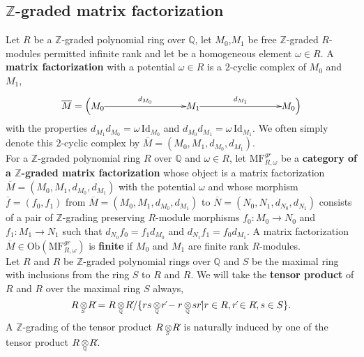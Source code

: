 \documentclass[10pt]{amsart}
\theoremstyle{break}
\begin{document}
\subsection{${{\mathbb{Z}}}$-graded matrix factorization}
\indent
Let $R$ be a ${{\mathbb{Z}}}$-graded polynomial ring over ${{\mathbb{Q}}}$, let $M_0$,$M_1$ be free ${{\mathbb{Z}}}$-graded $R$-modules permitted infinite rank and let be a homogeneous element $\omega \in R$. 
A {\bf matrix factorization} 
with a potential $\omega \in R$ is a $2$-cyclic complex of $M_0$ and $M_1$,
$$
\overline{M}=\Big( \xymatrix{
*^{M_0}\ar[rrr]^{d_{M_0}}&&&*^{M_1}\ar[rrr]^{d_{M_1}}&&&*^{M_0}
}
\Big)
$$
with the properties $d_{M_1} d_{M_0} = \omega\,{{\mathrm{Id}}}_{M_0}$ and $d_{M_0} d_{M_1} = \omega\,{{\mathrm{Id}}}_{M_1}$. We often simply denote this $2$-cyclic complex by $\overline{M}=(M_0,M_1,d_{M_0},d_{M_1})$.\\
\indent
For a ${{\mathbb{Z}}}$-graded polynomial ring $R$ over ${{\mathbb{Q}}}$ and $\omega \in R$, let ${{\mathrm{MF}}}^{gr}_{R,\omega}$ be a {\bf category of a ${{\mathbb{Z}}}$-graded matrix factorization} 
whose object is a matrix factorization $\overline{M}=(M_0,M_1,d_{M_0},d_{M_1})$ with the potential $\omega$ 
and whose morphism $\overline{f}=(f_0,f_1)$ from $\overline{M}=(M_0,M_1,d_{M_0},d_{M_1})$ to $\overline{N}=(N_0,N_1,d_{N_0},d_{N_1})$ consists of a pair of ${{\mathbb{Z}}}$-grading preserving $R$-module morphisms 
$f_0:M_0 \to N_0$ and $f_1:M_1 \to N_1$ such that $d_{N_0} f_0 = f_1 d_{M_0}$ and 
$d_{N_1} f_1 = f_0 d_{M_1}$. A matrix factorization $\overline{M}\in {{\mathrm{Ob}}} ({{\mathrm{MF}}}^{gr}_{R,\omega})$ is {\bf finite} if $M_0$ and $M_1$ are finite rank $R$-modules.\\
\indent
Let $R$ and $R\acute{}$ be ${{\mathbb{Z}}}$-graded polynomial rings over ${{\mathbb{Q}}}$ and $S$ be the maximal ring with inclusions from the ring $S$ to $R$ and $R\acute{}$.
We will take the {\bf tensor product} of $R$ and $R\acute{}$ over the maximal ring $S$ always,
\begin{equation*}
R{{\,\otimes\hspace{-0.7em}\raisebox{-0.5ex}{${}_{{}_{S}}$}\,}} R\acute{}=R{{\,\otimes\hspace{-0.6em}\raisebox{-0.5ex}{${}_{{}_{{\mathbb{Q}}}}$}\,}} R\acute{}/\{rs{{\,\otimes\hspace{-0.6em}\raisebox{-0.5ex}{${}_{{}_{{\mathbb{Q}}}}$}\,}} r\acute{}-r{{\,\otimes\hspace{-0.6em}\raisebox{-0.5ex}{${}_{{}_{{\mathbb{Q}}}}$}\,}} sr\acute{}|r\in R,r\acute{}\in R\acute{},s\in S\}.
\end{equation*} 
A ${{\mathbb{Z}}}$-grading of the tensor product $R{{\,\otimes\hspace{-0.7em}\raisebox{-0.5ex}{${}_{{}_{S}}$}\,}} R\acute{}$ is naturally induced by one of the tensor product $R{{\,\otimes\hspace{-0.6em}\raisebox{-0.5ex}{${}_{{}_{{\mathbb{Q}}}}$}\,}} R\acute{}$. 
\end{document}
